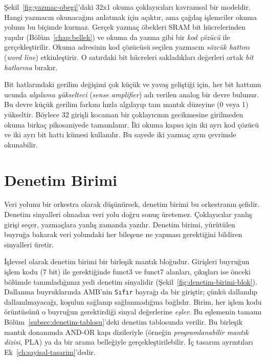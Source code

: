 \begin{bilginot}
Şekil~\ref{fig:yazmac-obegi}'daki 32x1 okuma çoklayıcıları kavramsal bir modeldir. Hangi yazmacın okunacağını anlatmak için açıktır, ama çağdaş işlemciler okuma yolunu bu biçimde kurmaz. Gerçek yazmaç öbekleri SRAM bit hücrelerinden yapılır (Bölüm~\ref{chap:bellek}) ve okuma da yazma gibi bir \emph{kod çözücü} ile gerçekleştirilir. Okuma adresinin kod çözücüsü seçilen yazmacın \emph{sözcük hattını} (\emph{word line}) etkinleştirir. O satırdaki bit hücreleri sakladıkları değerleri ortak \emph{bit hatlarına} bırakır.

Bit hatlarındaki gerilim değişimi çok küçük ve yavaş geliştiği için, her bit hattının ucunda \emph{algılama yükselteci} (\emph{sense amplifier}) adı verilen analog bir devre bulunur. Bu devre küçük gerilim farkını hızla algılayıp tam mantık düzeyine (0 veya 1) yükseltir. Böylece 32 girişli kocaman bir çoklayıcının gecikmesine girilmeden okuma birkaç pikosaniyede tamamlanır. İki okuma kapısı için iki ayrı kod çözücü ve iki ayrı bit hattı kümesi kullanılır. Bu sayede iki yazmaç aynı çevrimde okunabilir.
\end{bilginot}

\section{Denetim Birimi}
\label{sec:denetim-birimi}

Veri yolunu bir orkestra olarak düşünürsek, denetim birimi bu orkestranın şefidir. Denetim sinyalleri olmadan veri yolu doğru sonuç üretemez. Çoklayıcılar yanlış girişi seçer, yazmaçlara yanlış zamanda yazılır. Denetim birimi, yürütülen buyruğa bakarak veri yolundaki her bileşene ne yapması gerektiğini bildiren sinyalleri üretir.

İşlevsel olarak denetim birimi bir birleşik mantık bloğudur. Girişleri buyruğun işlem kodu (7 bit) ile gerektiğinde funct3 ve funct7 alanları, çıkışları ise önceki bölümde tanımladığımız yedi denetim sinyalidir (Şekil~\ref{fig:denetim-birimi-blok}). Dallanma buyruklarında AMB'nin \texttt{Sıfır} bayrağı da bir giriştir; çünkü dallanılıp dallanılmayacağı, koşulun sağlanıp sağlanmadığına bağlıdır. Birim, her işlem kodu örüntüsünü o buyruğun gerektirdiği sinyal değerlerine \emph{eşler}. Bu eşlemenin tamamı Bölüm~\ref{subsec:denetim-tablosu}'deki denetim tablosunda verilir. Bu birleşik mantık donanımda AND-OR kapı dizileriyle (örneğin \emph{programlanabilir mantık dizisi}, PLA) ya da bir arama belleğiyle gerçekleştirilebilir. İç tasarım ayrıntıları Ek~\ref{ch:sayisal-tasarim}'dedir.

